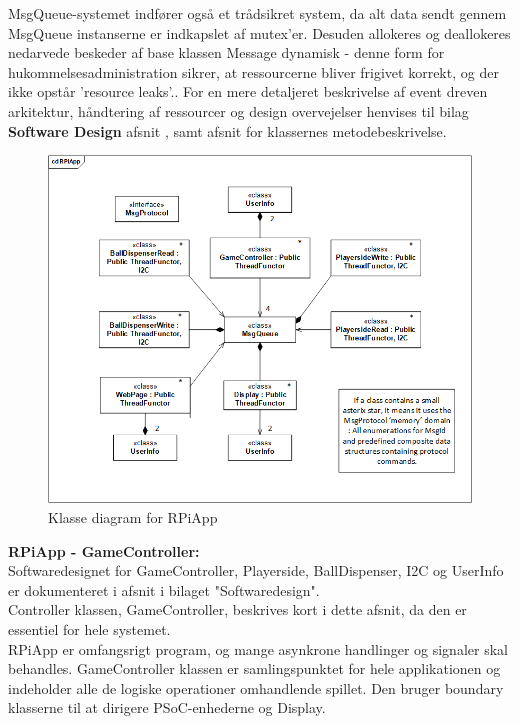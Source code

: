 \documentclass[Rapport/Rapport_main.tex]{subfiles}
\begin{document}
MsgQueue-systemet indfører også et trådsikret system, da alt data sendt gennem MsgQueue instanserne er indkapslet af mutex'er. Desuden allokeres og deallokeres nedarvede beskeder af base klassen Message dynamisk - denne form for hukommelsesadministration sikrer, at ressourcerne bliver frigivet korrekt, og der ikke opstår 'resource leaks'.\autocite{Resource}. For en mere detaljeret beskrivelse af event dreven arkitektur, håndtering af ressourcer og design overvejelser henvises til bilag \textbf{Software Design} afsnit , samt afsnit  for klassernes metodebeskrivelse.
\begin{figure}[H]
    \centering
    \includegraphics[width=1\textwidth]{Rapport/RPi/graphics/cd_RPiApp.png}
    \caption{Klasse diagram for RPiApp}
   \label{fig:cd_RPiApp}
\end{figure}
\textbf{RPiApp - GameController:}\\
Softwaredesignet for GameController, Playerside, BallDispenser, I2C og UserInfo er dokumenteret i afsnit  i bilaget "Softwaredesign". \\
Controller klassen, GameController, beskrives kort i dette afsnit, da den er essentiel for hele systemet. \\
RPiApp er omfangsrigt program, og mange asynkrone handlinger og signaler skal behandles. GameController klassen er samlingspunktet for hele applikationen og indeholder alle de logiske operationer omhandlende spillet. Den bruger boundary klasserne til at dirigere PSoC-enhederne og Display. 
\end{document}
